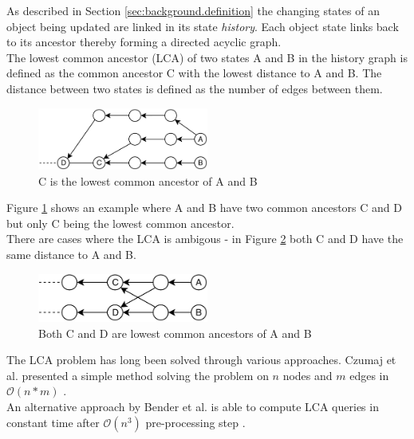 As described in Section \ref{sec:background.definition} the changing states of an object being updated are linked in its state \emph{history}.
Each object state links back to its ancestor thereby forming a directed acyclic graph.\\
The lowest common ancestor (LCA) of two states A and B in the history graph is defined as the common ancestor C with the lowest distance to A and B.
The distance between two states is defined as the number of edges between them.

\begin{figure}[H]
  \centering
  \includegraphics[width=0.5\textwidth]{img/lca1}
  \caption{C is the lowest common ancestor of A and B}
  \label{fig:background.lca.one}
\end{figure}

Figure \ref{fig:background.lca.one} shows an example where A and B have two common ancestors C and D but only C being the lowest common ancestor.\\
There are cases where the LCA is ambigous - in Figure \ref{fig:background.lca.two} both C and D have the same distance to A and B.\\

\begin{figure}[H]
  \centering
  \includegraphics[width=0.5\textwidth]{img/lca2}
  \caption{Both C and D are lowest common ancestors of A and B}
  \label{fig:background.lca.two}
\end{figure}

The LCA problem has long been solved through various approaches.
Czumaj et al. presented a simple method solving the problem on  $ n $ nodes and $ m $ edges in $\mathcal O(n*m)$ \cite{Czumaj:2007ht}.\\
An alternative approach by Bender et al. is able to compute LCA queries in constant time after $\mathcal O(n^3) $ pre-processing step \cite{Bender:2005dg}.

